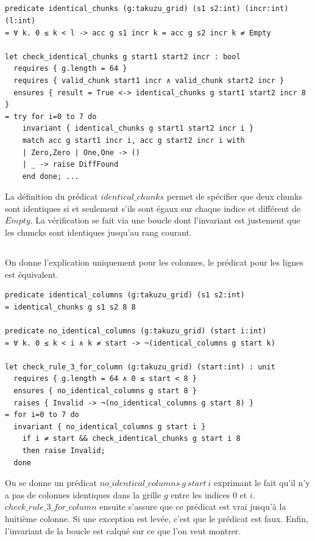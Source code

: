 ﻿\documentclass[10pt,a4paper]{article}
\begin{document}
\subsection{}
\begin{verbatim}
predicate identical_chunks (g:takuzu_grid) (s1 s2:int) (incr:int) (l:int)
= ∀ k. 0 ≤ k < l -> acc g s1 incr k = acc g s2 incr k ≠ Empty

let check_identical_chunks g start1 start2 incr : bool
  requires { g.length = 64 }
  requires { valid_chunk start1 incr ∧ valid_chunk start2 incr }
  ensures { result = True <-> identical_chunks g start1 start2 incr 8 }
= try for i=0 to 7 do
    invariant { identical_chunks g start1 start2 incr i }
    match acc g start1 incr i, acc g start2 incr i with
    | Zero,Zero | One,One -> ()
    | _ -> raise DiffFound
    end done; ...
\end{verbatim}
La définition du prédicat $identical\_chunks$ permet de spécifier que deux chunks sont identiques si et seulement s’ils sont égaux sur chaque indice et différent de $Empty$.
La vérification se fait via une boucle dont l'invariant est justement que les chuncks sont identiques jusqu'au rang courant.

\subsection{}
On donne l'explication uniquement pour les colonnes, le prédicat pour les lignes est équivalent.

\begin{verbatim}
predicate identical_columns (g:takuzu_grid) (s1 s2:int)
= identical_chunks g s1 s2 8 8

predicate no_identical_columns (g:takuzu_grid) (start i:int)
= ∀ k. 0 ≤ k < i ∧ k ≠ start -> ¬(identical_columns g start k)

let check_rule_3_for_column (g:takuzu_grid) (start:int) : unit
  requires { g.length = 64 ∧ 0 ≤ start < 8 }
  ensures { no_identical_columns g start 8 }
  raises { Invalid -> ¬(no_identical_columns g start 8) }
= for i=0 to 7 do
  invariant { no_identical_columns g start i }
    if i ≠ start && check_identical_chunks g start i 8
    then raise Invalid;
  done
\end{verbatim}

On se donne un prédicat $no\_identical\_columns\ g\ start\ i$ exprimant le fait qu'il n'y a pas de colonnes identiques dans la grille $g$ entre les indices $0$ et $i$. $check\_rule\_3\_for\_column$ ensuite s'assure que ce prédicat est vrai jusqu'à la huitième colonne. Si une exception est levée, c'est que le prédicat est faux. Enfin, l'invariant de la boucle est calqué sur ce que l'on veut montrer.
\end{document}
